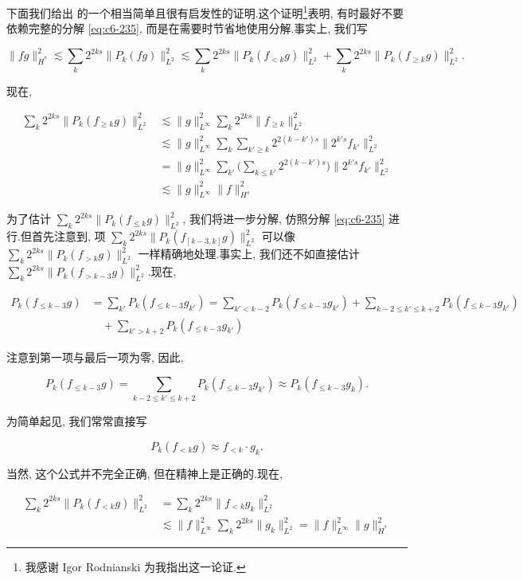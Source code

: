 下面我们给出 的一个相当简单且很有启发性的证明.这个证明\footnote{我感谢 Igor Rodnianski 为我指出这一论证.}表明, 有时最好不要依赖完整的分解 \eqref{eq:c6-235}, 而是在需要时节省地使用分解.事实上, 我们写

\[
\|fg\|_{\dot{H}^s}^2 \lesssim \sum_k 2^{2ks} \|P_k(fg)\|_{L^2}^2 \lesssim \sum_k 2^{2ks} \|P_k(f_{< k} g)\|_{L^2}^2 + \sum_k 2^{2ks} \|P_k(f_{\geq k} g)\|_{L^2}^2.
\]

现在,

\[
\begin{aligned}
\sum_k 2^{2ks} \|P_k(f_{\geq k} g)\|_{L^2}^2 &\lesssim \|g\|_{L^\infty}^2 \sum_k 2^{2ks} \|f_{\geq k}\|_{L^2}^2\\
&\lesssim \|g\|_{L^\infty}^2 \sum_k \sum_{k' \geq k} 2^{2(k-k')s} \|2^{k's} f_{k'}\|_{L^2}^2\\
&= \|g\|_{L^\infty}^2 \sum_{k'} \big(\sum_{k \leq k'} 2^{2(k-k')s}\big) \|2^{k's} f_{k'}\|_{L^2}^2\\
&\lesssim \|g\|_{L^\infty}^2 \|f\|_{H^s}^2
\end{aligned}
\]

为了估计 $\sum_k 2^{2ks} \|P_k(f_{\leq k} g)\|_{L^2}^2$, 我们将进一步分解, 仿照分解 \eqref{eq:c6-235} 进行.但首先注意到, 项 $\sum_k 2^{2ks} \|P_k(f_{[k-3, k]} g)\|_{L^2}^2$ 可以像 $\sum_k 2^{2ks} \|P_k(f_{> k} g)\|_{L^2}^2$ 一样精确地处理.事实上, 我们还不如直接估计 $\sum_k 2^{2ks} \|P_k(f_{> k-3} g)\|_{L^2}^2$.现在,

\[
\begin{aligned}
P_k(f_{\leq k-3} g) &= \sum_{k'} P_k(f_{\leq k-3} g_{k'}) = \sum_{k' < k-2} P_k(f_{\leq k-3} g_{k'}) + \sum_{k-2 \leq k' \leq k+2} P_k(f_{\leq k-3} g_{k'})\\
&\quad + \sum_{k' > k+2} P_k(f_{\leq k-3} g_{k'})
\end{aligned}
\]

注意到第一项与最后一项为零, 因此,

\[
P_k(f_{\leq k-3} g) = \sum_{k-2 \leq k' \leq k+2} P_k(f_{\leq k-3} g_{k'}) \approx P_k(f_{\leq k-3} g_k).
\]

为简单起见, 我们常常直接写

\begin{equation}
P_k(f_{< k} g) \approx f_{< k} \cdot g_k.\label{eq:c6-243}
\end{equation}

当然, 这个公式并不完全正确, 但在精神上是正确的.现在,

\[
\begin{aligned}
\sum_k 2^{2ks} \|P_k(f_{< k} g)\|_{L^2}^2 &= \sum_k 2^{2ks} \|f_{< k} g_k\|_{L^2}^2\\
&\lesssim \|f\|_{L^\infty}^2 \sum_k 2^{2ks} \|g_k\|_{L^2}^2 = \|f\|_{L^\infty}^2 \|g\|_{\dot{H}^s}^2
\end{aligned}
\]

